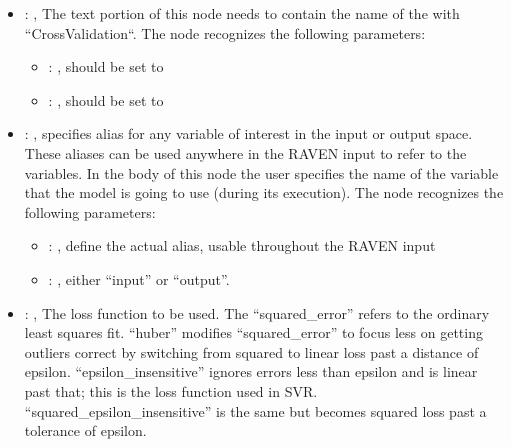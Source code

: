 \begin{itemize}
\begin{itemize}
        \item {}: ,
          List of IDs of features/variables to include in the transformation process.

        \item {}: ,
          Which space to search? Target or Feature?
      \end{itemize}

    \item {}: ,
      The text portion of this node needs to contain the name of the  with
               ``CrossValidation``.
      The  node recognizes the following parameters:
        \begin{itemize}
          \item {}: ,
            should be set to 
          \item {}: ,
            should be set to 
      \end{itemize}

    \item {}: ,
      specifies alias for         any variable of interest in the input or output space. These
      aliases can be used anywhere in the RAVEN input to         refer to the variables. In the body
      of this node the user specifies the name of the variable that the model is going to use
      (during its execution).
      The  node recognizes the following parameters:
        \begin{itemize}
          \item {}: ,
            define the actual alias, usable throughout the RAVEN input
          \item {}: ,
            either ``input'' or ``output''.
      \end{itemize}

    \item {}: ,
      The loss function to be used.                                                  The
      ``squared\_error'' refers to the ordinary least squares fit. ``huber'' modifies
      ``squared\_error'' to focus less on getting outliers correct by
      switching from squared to linear loss past a distance of epsilon. ``epsilon\_insensitive''
      ignores errors less than epsilon and is linear past
      that; this is the loss function used in SVR. ``squared\_epsilon\_insensitive'' is the same but
      becomes squared loss past a tolerance of epsilon.


\end{itemize}

